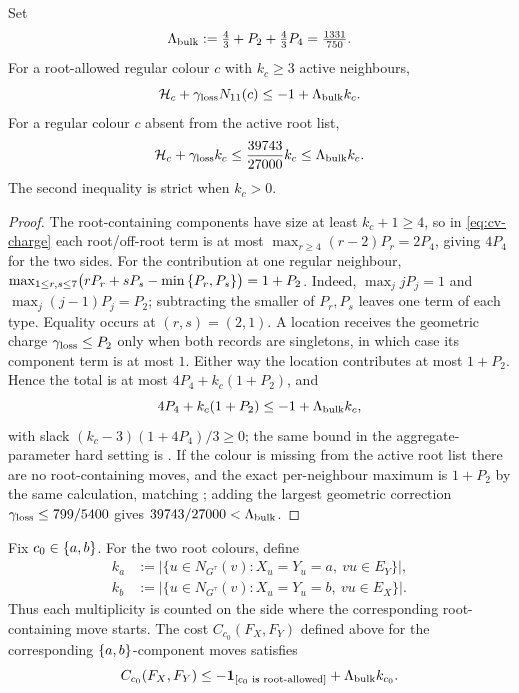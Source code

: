 \begin{lemma}\label{lem:cv-high}
Set
\[
 \Lambda_{\rm bulk}:=\tfrac43+P_2+\tfrac43P_4=\tfrac{1331}{750}.
\]
For a root-allowed regular colour \(c\) with $k_c\ge3$ active neighbours,
\[
 \mathcal H_c+\gamma_{\rm loss}N_{11}(c)
 \le-1+\Lambda_{\rm bulk}k_c.
\]
For a regular colour \(c\) absent from the active root list,
\[
 \mathcal H_c+\gamma_{\rm loss}k_c
 \le \frac{39743}{27000}k_c\le\Lambda_{\rm bulk}k_c.
\]
The second inequality is strict when $k_c>0$.
\end{lemma}

\begin{proof}
The root-containing components have size at least $k_c+1\ge4$, so in
\eqref{eq:cv-charge} each root/off-root term is at most
\(\max_{r\ge4}(r-2)P_r=2P_4\), giving \(4P_4\) for the two sides. For the
contribution at one regular neighbour,
\(\max_{1\le r,s\le7}
  \bigl(rP_r+sP_s-\min\left\{P_r,P_s\right\}\bigr)=1+P_2\).
Indeed, $\max_j jP_j=1$ and $\max_j(j-1)P_j=P_2$; subtracting the smaller
of \(P_r,P_s\) leaves one term of each type.  Equality occurs at
\((r,s)=(2,1)\).  A location receives the geometric charge
$\gamma_{\rm loss}\le P_2$ only when both records are singletons, in
which case its component term is at most $1$. Either way the location
contributes at most $1+P_2$. Hence the total is at most
$4P_4+k_c(1+P_2)$, and
\[
 4P_4+k_c(1+P_2)\le-1+\Lambda_{\rm bulk}k_c,
\]
with slack $(k_c-3)(1+4P_4)/3\ge0$; the
same bound in the aggregate-parameter hard setting is
\cite[Lemma~4.6]{CarlsonVigoda2024}. If the colour is missing from the
active root list there are no root-containing moves, and the exact
per-neighbour maximum is $1+P_2$ by the same calculation, matching
\cite[Lemma~4.7]{CarlsonVigoda2024}; adding the largest geometric
correction $\gamma_{\rm loss}\le799/5400$ gives
$39743/27000<\Lambda_{\rm bulk}$.
\end{proof}

\begin{lemma}\label{lem:cv-special}
Fix $c_0\in\left\{a,b\right\}$.  For the two root colours, define
\[
\begin{aligned}
 k_a&:=\bigl|\{u\in N_{G^\tau}(v):X_u=Y_u=a,\ vu\in E_Y\}\bigr|,\\
 k_b&:=\bigl|\{u\in N_{G^\tau}(v):X_u=Y_u=b,\ vu\in E_X\}\bigr|.
\end{aligned}
\]
Thus each multiplicity is counted on the side where the corresponding
root-containing move starts.  The cost \(C_{c_0}(F_X,F_Y)\) defined above for the corresponding
$\left\{a,b\right\}$-component moves satisfies
\[
 C_{c_0}(F_X,F_Y)\le-\mathbf{1}_{\left[c_0\text{ is root-allowed}\right]}
              +\Lambda_{\rm bulk}k_{c_0}.
\]
\end{lemma}

